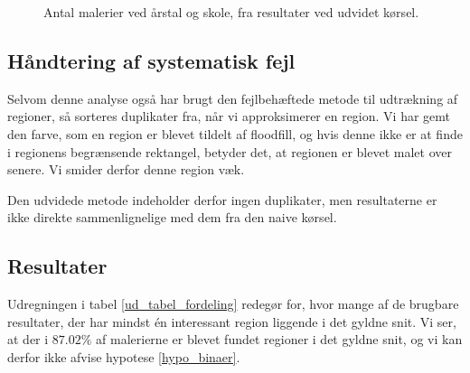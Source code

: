 {\begin{figure}[!h]
    \centering
    \hspace{1em}
    \caption[]{Antal malerier ved årstal og skole, fra resultater
    ved udvidet kørsel.}
    \label{ud_year_nation}
\end{figure}

\subsection{Håndtering af systematisk fejl}
Selvom denne analyse også har brugt den fejlbehæftede metode til
udtrækning af regioner, så sorteres duplikater fra, når vi approksimerer
en region. Vi har gemt den farve, som en region er blevet tildelt af
floodfill, og hvis denne ikke er at finde i regionens begrænsende
rektangel, betyder det, at regionen er blevet malet over senere. Vi
smider derfor denne region væk.

Den udvidede metode indeholder derfor ingen duplikater, men resultaterne
er ikke direkte sammenlignelige med dem fra den naive kørsel.

\subsection{Resultater}
Udregningen i tabel \ref{ud_tabel_fordeling} redegør for, hvor mange af
de brugbare resultater, der har mindst én interessant region liggende i
det gyldne snit. Vi ser, at der i $87.02\%$ af malerierne er blevet
fundet regioner i det gyldne snit, og vi kan derfor ikke afvise hypotese
\ref{hypo_binaer}.

}
